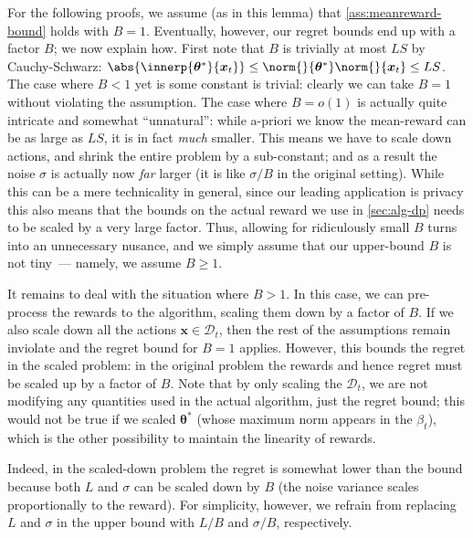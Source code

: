 \documentclass{article}
\renewcommand{\vec}[1]{\bm{#1}}
\DeclarePairedDelimiter{\abs}||
\newcommand{\D}{\mathcal{D}}
\begin{document}
\begin{remark}%
  \label{remark:meanreward-bound}
  For the following proofs, we assume (as in this lemma) that
  \cref{ass:meanreward-bound} holds with $B=1$.  Eventually, however,
  our regret bounds end up with a factor $B$; we now explain how.
  First note that $B$ is trivially at most $LS$ by Cauchy-Schwarz:
  $\abs{\innerp{\vec\theta^*}{\vec x_t}} \le
  \norm{}{\vec\theta^*}\norm{}{\vec x_t} \le LS$.  The case where $B<1$ yet is some constant is trivial: clearly we can take $B=1$ without violating the assumption.  The case where $B=o(1)$ is actually quite intricate and somewhat ``unnatural'': while a-priori  we know the mean-reward can be as large as $LS$, it is in fact \emph{much} smaller. This means we have to scale down actions, and shrink the entire problem by a sub-constant; and as a result the noise $\sigma$ is actually now \emph{far} larger (it is like $\sigma/B$ in the original setting). While this can be a mere technicality in general, since our leading application is privacy this also means that the bounds on the actual reward we use in \cref{sec:alg-dp} needs to be scaled by a very large factor. Thus, allowing for ridiculously small $B$ turns into an unnecessary nusance, and we simply assume that our upper-bound $B$ is not tiny~--- namely, we assume $B\geq 1$. 
  
  It
  remains to deal with the situation where $B>1$.
  In this case, we can pre-process the rewards to the algorithm,
  scaling them down by a factor of $B$.  If we also scale down all the
  actions $\vec x\in\D_t$, then the rest of the assumptions remain
  inviolate and the regret bound for $B=1$ applies.  However, this
  bounds the regret in the scaled problem: in the original problem the
  rewards and hence regret must be scaled up by a factor of $B$.  Note
  that by only scaling the $\D_t$, we are not modifying any
  quantities used in the actual algorithm, just the regret bound; this
  would not be true if we scaled $\vec\theta^*$ (whose maximum norm
  appears in the $\beta_t$), which is the other
  possibility to maintain the linearity of rewards.

  Indeed, in the scaled-down problem the regret is somewhat lower than
  the bound because both $L$ and $\sigma$ can be scaled down by $B$
  (the noise variance scales proportionally to the reward).  For
  simplicity, however, we refrain from replacing $L$ and $\sigma$ in
  the upper bound with $L/B$ and $\sigma/B$, respectively.
\end{remark}
\end{document}
